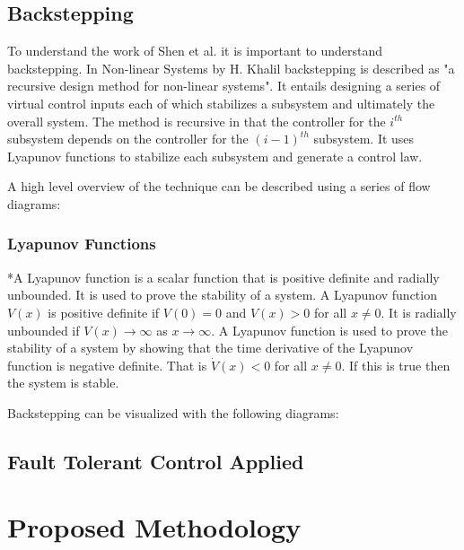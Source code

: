 \subsection{Backstepping}
To understand the work of Shen et al. \cite{shenActiveFaulttolerantControl2019} it is important to understand backstepping. In Non-linear Systems by H. Khalil \cite{khalilNonlinearSystems2002} backstepping is described as "a recursive design method for non-linear systems". It entails designing a series of virtual control inputs each of which stabilizes a subsystem and ultimately the overall system. The method is recursive in that the controller for the $i^{th}$ subsystem depends on the controller for the $(i-1)^{th}$ subsystem. It uses Lyapunov functions to stabilize each subsystem and generate a control law.

A high level overview of the technique can be described using a series of flow diagrams:



\subsubsection{Lyapunov Functions}
*A Lyapunov function is a scalar function that is positive definite and radially unbounded. It is used to prove the stability of a system. A Lyapunov function $V(x)$ is positive definite if $V(0)=0$ and $V(x)>0$ for all $x\neq0$. It is radially unbounded if $V(x)\rightarrow\infty$ as $x\rightarrow\infty$. A Lyapunov function is used to prove the stability of a system by showing that the time derivative of the Lyapunov function is negative definite. That is $\dot{V}(x)<0$ for all $x\neq0$. If this is true then the system is stable.

\par
Backstepping can be visualized with the following diagrams:


\subsection{Fault Tolerant Control Applied}

\section{Proposed Methodology}
